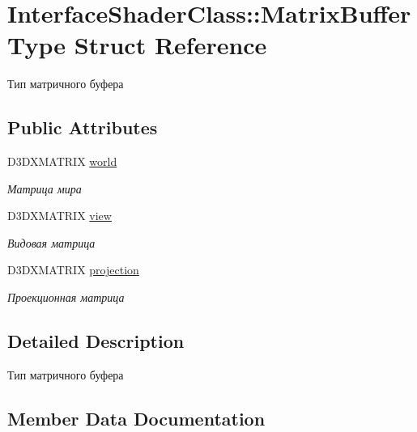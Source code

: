 \hypertarget{struct_interface_shader_class_1_1_matrix_buffer_type}{}\section{Interface\+Shader\+Class\+:\+:Matrix\+Buffer\+Type Struct Reference}
\label{struct_interface_shader_class_1_1_matrix_buffer_type}


Тип матричного буфера  


\subsection*{Public Attributes}
\begin{DoxyCompactItemize}
\item 
D3\+D\+X\+M\+A\+T\+R\+IX \hyperlink{struct_interface_shader_class_1_1_matrix_buffer_type_a66be0d6e9857141520900d3c3150d9ea}{world}
\begin{DoxyCompactList}\small\item\em Матрица мира \end{DoxyCompactList}\item 
D3\+D\+X\+M\+A\+T\+R\+IX \hyperlink{struct_interface_shader_class_1_1_matrix_buffer_type_a72499deb70a66b812b417ca5e39e77df}{view}
\begin{DoxyCompactList}\small\item\em Видовая матрица \end{DoxyCompactList}\item 
D3\+D\+X\+M\+A\+T\+R\+IX \hyperlink{struct_interface_shader_class_1_1_matrix_buffer_type_acb0c0d860d057e21f4666bf4bae1b946}{projection}
\begin{DoxyCompactList}\small\item\em Проекционная матрица \end{DoxyCompactList}\end{DoxyCompactItemize}


\subsection{Detailed Description}
Тип матричного буфера 

\subsection{Member Data Documentation}
\mbox{\label{struct_interface_shader_class_1_1_matrix_buffer_type_acb0c0d860d057e21f4666bf4bae1b946}} 

